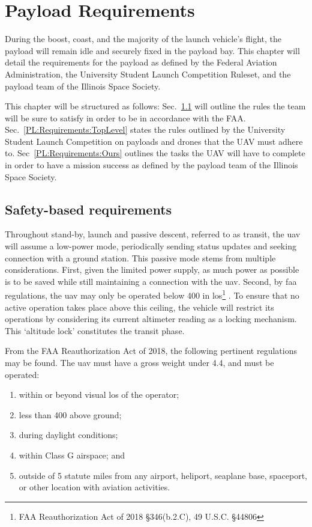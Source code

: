\chapter{Payload Requirements}

	During the boost, coast, and the majority of the launch vehicle's flight, the payload will remain idle and securely fixed in the payload bay. This chapter will detail the requirements for the payload as defined by the Federal Aviation Administration, the University Student Launch Competition Ruleset, and the payload team of the Illinois Space Society.

	This chapter will be structured as follows: Sec.~\ref{PL:Requirements:Safety} will outline the rules the team will be sure to satisfy in order to be in accordance with the FAA. Sec.~\ref{PL:Requirements:TopLevel} states the rules outlined by the University Student Launch Competition on payloads and drones that the UAV must adhere to. Sec~\ref{PL:Requirements:Ours} outlines the tasks the UAV will have to complete in order to have a mission success as defined by the payload team of the Illinois Space Society.

\section{Safety-based requirements}\label{PL:Requirements:Safety}

	Throughout stand-by, launch and passive descent, referred to as transit, the \gls{uav} will assume a low-power mode, periodically sending status updates and seeking connection with a ground station. This passive mode stems from multiple considerations. First, given the limited power supply, as much power as possible is to be saved while still maintaining a connection with the \gls{uav}. Second, by \gls{faa} regulations, the \gls{uav} may only be operated below \SI{400}{\feet} in \gls{los}\footnote{FAA Reauthorization Act of 2018 \S 346(b.2.C), 49 U.S.C. \S 44806} \citep{FederalAviationAdministration2018}. To ensure that no active operation takes place above this ceiling, the vehicle will restrict its operations by considering its current altimeter reading as a locking mechanism. This `altitude lock' constitutes the transit phase.

	From the FAA Reauthorization Act of 2018, the following pertinent regulations may be found. The \gls{uav} must have a gross weight under \SI{4.4}{\poundm}, and must be operated:

	\begin{enumerate}[noitemsep, label=(\roman*)]
		\item within or beyond visual \gls{los} of the operator;
		\item less than \SI{400}{\feet} above ground;
		\item during daylight conditions;
		\item within Class G airspace; and
		\item outside of 5 statute miles from any airport, heliport, seaplane base, spaceport, or other location with aviation activities.
	\end{enumerate}

